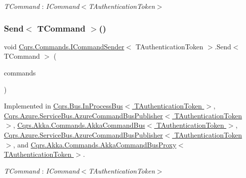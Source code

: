\begin{Desc}
\item[Type Constraints]\begin{description}
\item[{\em T\+Command} : {\em I\+Command$<$T\+Authentication\+Token$>$}]\end{description}
\end{Desc}
\mbox{\label{interfaceCqrs_1_1Commands_1_1ICommandSender_a3fb3ec40a3e862f721a7c9204e67e832_a3fb3ec40a3e862f721a7c9204e67e832}} 
\subsubsection{\texorpdfstring{Send$<$ T\+Command $>$()}{Send< TCommand >()}\hspace{0.1cm}{\footnotesize\ttfamily [2/2]}}
{\footnotesize\ttfamily void \hyperlink{interfaceCqrs_1_1Commands_1_1ICommandSender}{Cqrs.\+Commands.\+I\+Command\+Sender}$<$ T\+Authentication\+Token $>$.Send$<$ T\+Command $>$ (\begin{DoxyParamCaption}\item[{I\+Enumerable$<$ T\+Command $>$}]{commands }\end{DoxyParamCaption})}



Implemented in \hyperlink{classCqrs_1_1Bus_1_1InProcessBus_ae5dae5f2445387280c974ec181167055_ae5dae5f2445387280c974ec181167055}{Cqrs.\+Bus.\+In\+Process\+Bus$<$ T\+Authentication\+Token $>$}, \hyperlink{classCqrs_1_1Azure_1_1ServiceBus_1_1AzureCommandBusPublisher_a1f6742c31a81a1bc96962acd28d4e8d2_a1f6742c31a81a1bc96962acd28d4e8d2}{Cqrs.\+Azure.\+Service\+Bus.\+Azure\+Command\+Bus\+Publisher$<$ T\+Authentication\+Token $>$}, \hyperlink{classCqrs_1_1Akka_1_1Commands_1_1AkkaCommandBus_a06b7b148493c67d79aaf6b7d59afa487_a06b7b148493c67d79aaf6b7d59afa487}{Cqrs.\+Akka.\+Commands.\+Akka\+Command\+Bus$<$ T\+Authentication\+Token $>$}, \hyperlink{classCqrs_1_1Azure_1_1ServiceBus_1_1AzureCommandBusPublisher_a1f6742c31a81a1bc96962acd28d4e8d2_a1f6742c31a81a1bc96962acd28d4e8d2}{Cqrs.\+Azure.\+Service\+Bus.\+Azure\+Command\+Bus\+Publisher$<$ T\+Authentication\+Token $>$}, and \hyperlink{classCqrs_1_1Akka_1_1Commands_1_1AkkaCommandBusProxy_a30115e2f8c964967aa8fe94712ece7c2_a30115e2f8c964967aa8fe94712ece7c2}{Cqrs.\+Akka.\+Commands.\+Akka\+Command\+Bus\+Proxy$<$ T\+Authentication\+Token $>$}.

\begin{Desc}
\item[Type Constraints]\begin{description}
\item[{\em T\+Command} : {\em I\+Command$<$T\+Authentication\+Token$>$}]\end{description}
\end{Desc}
